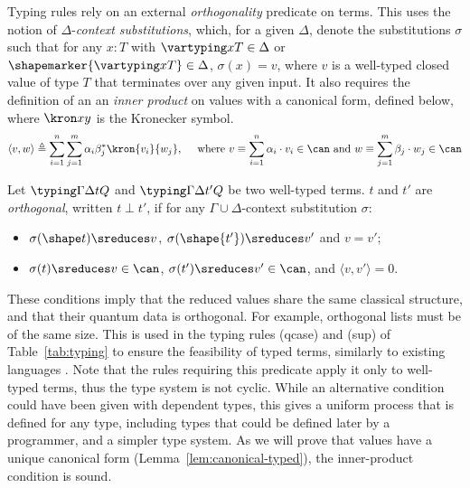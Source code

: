 Typing rules rely on an external \emph{orthogonality} predicate on terms. This
uses the notion of $\Delta$-\emph{context substitutions}, which, for a given
$\Delta$, denote the substitutions $\sigma$ such that for any $x : T$ with
$\vartyping x T \in \Delta$ or $\shapemarker{\vartyping x T} \in \Delta$,
$ \sigma(x)=v$, where $v$ is a well-typed closed value of type $T$
that terminates over any given input. It also requires the definition of an
an \emph{inner product} on values with a canonical form, defined
below, where $\kron x y$ is the Kronecker symbol.
\[
  \langle v, w \rangle \triangleq \sum_{i=1}^n \sum_{j=1}^m \alpha_i \beta_j^*
  \kron{v_i}{w_j}, \quad \text{ where }
  v \equiv \sum_{i=1}^n \alpha_i \cdot v_i \in \can \text{ and }
  w \equiv \sum_{j=1}^m \beta_j \cdot w_j \in \can
\]
\begin{definition}[Orthogonality]
  \label{def:orthogonality}
  Let $\typing \Gamma \Delta t Q$ and $\typing \Gamma \Delta {t'} Q$ be
  two well-typed terms. $t$ and $t'$ are \emph{orthogonal}, written $t \perp
  t'$, if for any $\Gamma \cup \Delta$-context substitution $\sigma$:
  \begin{itemize}
    \item $ \sigma(\shape t) \sreduces v$, $\sigma(\shape{t'})
      \sreduces v'$ and $v = v'$;
    \item $\sigma(t) \sreduces v \in \can$,
      $\sigma(t') \sreduces v' \in \can$,
      and $\langle v, v' \rangle = 0$.
  \end{itemize}
\end{definition}

These conditions imply that the reduced values share the same classical
structure, and that their quantum data is orthogonal. For example, orthogonal
lists must be of the same size. This is used in the typing rules
(qcase) and (sup) of Table~\ref{tab:typing} to ensure the feasibility of typed terms, similarly to
existing languages \cite{DCM22,Lem24,DLPZ25}. Note that the rules requiring
this predicate apply it only to well-typed terms, thus the type system is not
cyclic. While an alternative condition could have been given with dependent
types, this gives a uniform process that is defined for any type, including
types that could be defined later by a programmer, and a simpler type system.
As we will prove that values have a unique canonical form
(Lemma~\ref{lem:canonical-typed}), the inner-product condition is sound.

